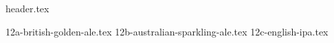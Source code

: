 \clearpage
{}
\divisorLine
{header.tex}
\begin{multicols}{2}
{12a-british-golden-ale.tex}
{12b-australian-sparkling-ale.tex}
{12c-english-ipa.tex}
\end{multicols}